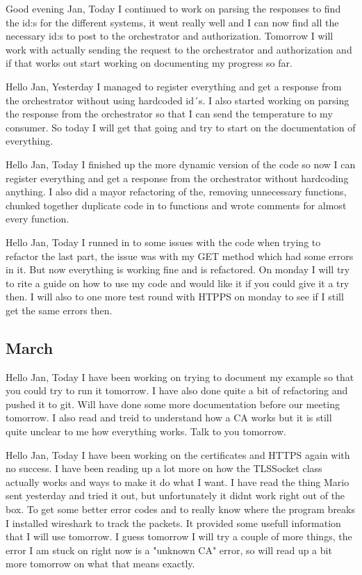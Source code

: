 Good evening Jan,
Today I continued to work on parsing the responses to find the id:s for the different systems, it went really well and I can now find all the necessary id:s 
to post to the orchestrator and authorization. Tomorrow I will work with actually sending the request to the orchestrator and authorization and if that works out 
start working on documenting my progress so far.

Hello Jan,
Yesterday I managed to register everything and get a response from the orchestrator without using hardcoded id´s. I also started working on parsing the response 
from the orchestrator so that I can send the temperature to my consumer. So today I will get that going and try to start on the documentation of everything.

Hello Jan,
Today I finished up the more dynamic version of the code so now I can register everything and get a response from the orchestrator without hardcoding anything.
I also did a mayor refactoring of the, removing unnecessary functions, chunked together duplicate code in to functions and wrote comments for almost every function.  

Hello Jan,
Today I runned in to some issues with the code when trying to refactor the last part, the issue was with my GET method which had some errors in it. But now everything
is working fine and is refactored. On monday I will try to rite a guide on how to use my code and would like it if you could give it a try then. I will also to one 
more test round with HTPPS on monday to see if I still get the same errors then.

\subsection{March}
Hello Jan,
Today I have been working on trying to document my example so that you could try to run it tomorrow. I have also done quite a bit of refactoring and pushed it to git.
Will have done some more documentation before our meeting tomorrow. I also read and treid to understand how a CA works but it is still quite unclear to me how everything
works. Talk to you tomorrow.

Hello Jan,
Today I have been working on the certificates and HTTPS again with no success. I have been reading up a lot more on how the TLSSocket class actually works and ways to make
it do what I want. I have read the thing Mario sent yesterday and tried it out, but unfortunately it didnt work right out of the box. To get some better error codes and to
really know where the program breaks I installed wireshark to track the packets. It provided some usefull information that I will use tomorrow. I guess tomorrow I will try
a couple of more things, the error I am stuck on right now is a "unknown CA" error, so will read up a bit more tomorrow on what that means exactly. 

